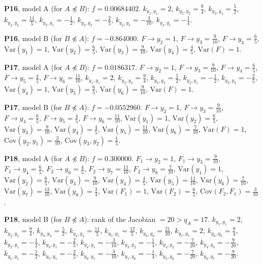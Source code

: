 \documentclass[10pt,a4paper]{article}
\newcommand{\nnest}{\not\preceq}
\begin{document}
{\noindent\textbf{P16}, model A (for $A\nnest B$): $f=0.00684402$. {\footnotesize $k_{y_{1},y_{1}}=2$, $k_{y_{2},y_{2}}=\tfrac{9}{4}$, $k_{y_{3},y_{3}}=\tfrac{5}{2}$, $k_{y_{4},y_{4}}=\tfrac{11}{5}$, $k_{y_{2},y_{1}}=-\tfrac{1}{2}$, $k_{y_{3},y_{2}}=-\tfrac{2}{5}$, $k_{y_{4},y_{3}}=-\tfrac{3}{10}$, $k_{y_{4},y_{1}}=-\tfrac{1}{4}$.}\par\smallskip
\noindent\textbf{P16}, model B (for $B\nnest A$): $f=-0.864000$. {\footnotesize $F\to y_{2}=1$, $F\to y_{3}=\tfrac{9}{10}$, $F\to y_{4}=\tfrac{6}{5}$, $\mathrm{Var}(y_{1})=1$, $\mathrm{Var}(y_{2})=\tfrac{6}{5}$, $\mathrm{Var}(y_{3})=\tfrac{9}{10}$, $\mathrm{Var}(y_{4})=\tfrac{4}{5}$, $\mathrm{Var}(F)=1$.}\par\smallskip
\noindent\textbf{P17}, model A (for $A\nnest B$): $f=0.0186317$. {\footnotesize $F\to y_{2}=1$, $F\to y_{3}=\tfrac{9}{10}$, $F\to y_{4}=\tfrac{6}{5}$, $F\to y_{5}=\tfrac{4}{5}$, $F\to y_{6}=\tfrac{11}{10}$, $k_{y_{1},y_{1}}=2$, $k_{y_{2},y_{2}}=\tfrac{9}{4}$, $k_{y_{3},y_{3}}=\tfrac{5}{2}$, $k_{y_{2},y_{1}}=-\tfrac{1}{2}$, $k_{y_{3},y_{2}}=-\tfrac{2}{5}$, $\mathrm{Var}(y_{4})=1$, $\mathrm{Var}(y_{5})=\tfrac{6}{5}$, $\mathrm{Var}(y_{6})=\tfrac{9}{10}$, $\mathrm{Var}(F)=1$.}\par\smallskip
\noindent\textbf{P17}, model B (for $B\nnest A$): $f=-0.0552960$. {\footnotesize $F\to y_{2}=1$, $F\to y_{3}=\tfrac{9}{10}$, $F\to y_{4}=\tfrac{6}{5}$, $F\to y_{5}=\tfrac{4}{5}$, $F\to y_{6}=\tfrac{11}{10}$, $\mathrm{Var}(y_{1})=1$, $\mathrm{Var}(y_{2})=\tfrac{6}{5}$, $\mathrm{Var}(y_{3})=\tfrac{9}{10}$, $\mathrm{Var}(y_{4})=\tfrac{4}{5}$, $\mathrm{Var}(y_{5})=\tfrac{11}{10}$, $\mathrm{Var}(y_{6})=\tfrac{7}{10}$, $\mathrm{Var}(F)=1$, $\mathrm{Cov}(y_{2},y_{1})=\tfrac{3}{10}$, $\mathrm{Cov}(y_{3},y_{2})=\tfrac{1}{5}$.}\par\smallskip
\noindent\textbf{P18}, model A (for $A\nnest B$): $f=0.300000$. {\footnotesize $F_{1}\to y_{2}=1$, $F_{1}\to y_{3}=\tfrac{9}{10}$, $F_{1}\to y_{4}=\tfrac{6}{5}$, $F_{2}\to y_{6}=\tfrac{4}{5}$, $F_{2}\to y_{7}=\tfrac{11}{10}$, $F_{2}\to y_{8}=\tfrac{7}{10}$, $\mathrm{Var}(y_{1})=1$, $\mathrm{Var}(y_{2})=\tfrac{6}{5}$, $\mathrm{Var}(y_{3})=\tfrac{9}{10}$, $\mathrm{Var}(y_{4})=\tfrac{4}{5}$, $\mathrm{Var}(y_{5})=\tfrac{11}{10}$, $\mathrm{Var}(y_{6})=\tfrac{7}{10}$, $\mathrm{Var}(y_{7})=\tfrac{13}{10}$, $\mathrm{Var}(y_{8})=\tfrac{3}{4}$, $\mathrm{Var}(F_{1})=1$, $\mathrm{Var}(F_{2})=\tfrac{6}{5}$, $\mathrm{Cov}(F_{2},F_{1})=\tfrac{3}{10}$.}\par\smallskip
\noindent\textbf{P18}, model B (for $B\nnest A$): rank of the Jacobian $=20>q_A=17$. {\footnotesize $k_{y_{1},y_{1}}=2$, $k_{y_{2},y_{2}}=\tfrac{9}{4}$, $k_{y_{3},y_{3}}=\tfrac{5}{2}$, $k_{y_{4},y_{4}}=\tfrac{11}{5}$, $k_{y_{5},y_{5}}=\tfrac{12}{5}$, $k_{y_{6},y_{6}}=\tfrac{21}{10}$, $k_{y_{7},y_{7}}=2$, $k_{y_{8},y_{8}}=\tfrac{9}{4}$, $k_{y_{2},y_{1}}=-\tfrac{1}{2}$, $k_{y_{3},y_{1}}=-\tfrac{2}{5}$, $k_{y_{4},y_{1}}=-\tfrac{3}{10}$, $k_{y_{3},y_{2}}=-\tfrac{1}{4}$, $k_{y_{4},y_{2}}=-\tfrac{7}{20}$, $k_{y_{4},y_{3}}=-\tfrac{9}{20}$, $k_{y_{6},y_{5}}=-\tfrac{1}{2}$, $k_{y_{7},y_{5}}=-\tfrac{2}{5}$, $k_{y_{8},y_{5}}=-\tfrac{3}{10}$, $k_{y_{7},y_{6}}=-\tfrac{1}{4}$, $k_{y_{8},y_{6}}=-\tfrac{7}{20}$, $k_{y_{8},y_{7}}=-\tfrac{9}{20}$.}\par\smallskip
}
\end{document}
